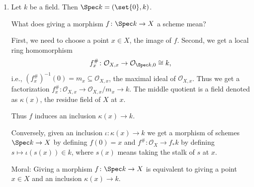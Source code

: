 \begin{enumerate}
	\item Let $k$ be a field. Then $\Spec k = (\set{0}, k)$.

		What does giving a morphism $f\colon \Spec k\to X$ a scheme mean?

		First, we need to choose a point $x \in X$, the image of $f$. Second,
		we get a local ring homomorphism
		\[ f^\#_x\colon \mathcal{O}_{X, x} \to \mathcal{O}_{\Spec k, 0} \cong k, \]
		i.e., $(f_x^\#)^{-1}(0) = m_x \subseteq \mathcal{O}_{X, x}$, the maximal
		ideal of $\mathcal{O}_{X, x}$. Thus we get a factorization
		$f^\#_x\colon \mathcal{O}_{X, x}\to \mathcal{O}_{X, x}/m_x \to k$.
		The middle quotient is a field denoted as $\kappa(x)$, the residue field
		of $X$ at $x$.

		Thus $f$ induces an inclusion $\kappa(x) \to k$.

		Conversely, given an inclusion $\iota\colon\kappa(x)\to k$ we get a morphism of
		schemes $\Spec k\to X$ by defining $f(0) = x$ and
		$f^\#\colon \mathcal{O}_X\to f_*k$ by defining $s\mapsto \iota(s(x)) \in k$,
		where $s(x)$ means taking the stalk of $s$ at $x$.

		Moral: Giving a morphism $f\colon \Spec k\to X$ is equivalent to giving
		a point $x \in X$ and an inclusion $\kappa(x)\to k$.
\end{enumerate}
